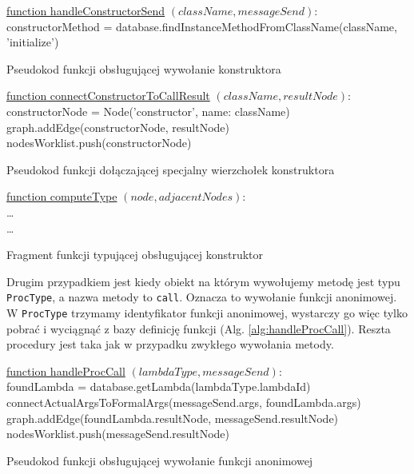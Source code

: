 \documentclass[declaration,shortabstract,mgr]{iithesis}
\newcommand{\algsize}{\small}
\begin{document}
\begin{algorithm}
    \algsize
    \underline{function handleConstructorSend} $(\mathit{className}, \mathit{messageSend})$:\\
    constructorMethod = database.findInstanceMethodFromClassName(className, 'initialize')\;
    \caption{Pseudokod funkcji obsługującej wywołanie konstruktora}
    \label{alg:handleConstructorSend}
\end{algorithm}

\begin{algorithm}
    \algsize
    \underline{function connectConstructorToCallResult} $(\mathit{className}, \mathit{resultNode})$:\\
    constructorNode = Node('constructor', name: className)\;
    graph.addEdge(constructorNode, resultNode)\;
    nodesWorklist.push(constructorNode)\;
    \caption{Pseudokod funkcji dołączającej specjalny wierzchołek konstruktora}
    \label{alg:connectConstructorToCallResult}
\end{algorithm}

\begin{algorithm}
    \algsize
    \underline{function computeType} $(\mathit{node}, \mathit{adjacentNodes})$:\\
    \ldots\\
    \ldots
    \caption{Fragment funkcji typującej obsługującej konstruktor}
    \label{alg:computeType-constructor}
\end{algorithm}

Drugim przypadkiem jest kiedy obiekt na którym wywołujemy metodę jest typu \texttt{ProcType}, a nazwa metody to \texttt{call}. Oznacza to wywołanie funkcji anonimowej. W \texttt{ProcType} trzymamy identyfikator funkcji anonimowej, wystarczy go więc tylko pobrać i wyciągnąć z bazy definicję funkcji (Alg. \ref{alg:handleProcCall}). Reszta procedury jest taka jak w przypadku zwykłego wywołania metody.

\begin{algorithm}
    \algsize
    \underline{function handleProcCall} $(\mathit{lambdaType}, \mathit{messageSend})$:\\
    foundLambda = database.getLambda(lambdaType.lambdaId)\;
    connectActualArgsToFormalArgs(messageSend.args, foundLambda.args)\;
    graph.addEdge(foundLambda.resultNode, messageSend.resultNode)\;
    nodesWorklist.push(messageSend.resultNode)\;
    \caption{Pseudokod funkcji obsługującej wywołanie funkcji anonimowej}
    \label{alg:handleProcCall}
\end{algorithm}
\end{document}
